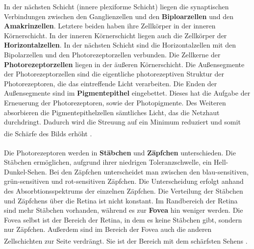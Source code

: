 \documentclass[12pt,a4paper,pdftex]{article}
\begin{document}
In der nächsten Schicht (innere plexiforme Schicht) liegen die synaptischen Verbindungen zwischen den Ganglienzellen und den \textbf{Biploarzellen}  und den \textbf{Amakrinzellen}.  Letztere beiden haben ihre Zellkörper in der inneren Körnerschicht. In der inneren Körnerschicht liegen auch die Zellkörper der \textbf{Horizontalzellen}.  In der nächsten Schicht sind die Horizontalzellen mit den Bipolarzellen und den Photorezeptorzellen verbunden. Die Zellkerne der \textbf{Photorezeptorzellen}  liegen in der äußeren Körnerschicht. Die Außensegmente der Photorezeptorzellen sind die eigentliche photorezeptiven Struktur der Photorezeptoren, die das eintreffende Licht verarbeiten. Die Enden der Außensegmente sind im \textbf{Pigmentepithel}  eingebettet. Dieses hat die Aufgabe der Erneuerung der Photorezeptoren, sowie der Photopigmente. Des Weiteren absorbieren die Pigmentepithelzellen sämtliches Licht, das die Netzhaut durchdringt. Dadurch wird die Streuung auf ein Minimum reduziert und somit die Schärfe des Bilds erhöht \textsuperscript{\cite[10]{neurowissenschaften_baer}}.
\\
\\
\noindent Die Photorezeptoren werden in \textbf{Stäbchen}  und \textbf{Zäpfchen}  unterschieden. Die Stäbchen ermöglichen, aufgrund ihrer niedrigen Toleranzschwelle, ein Hell-Dunkel-Sehen. Bei den Zäpfchen unterscheidet man zwischen den blau-sensitiven, grün-sensitiven und rot-sensitiven Zäpfchen. Die Unterscheidung erfolgt anhand des Absorbtionsspektrums der einzelnen Zäpfchen. Die Verteilung der Stäbchen und Zäpfchens über die Retina ist nicht konstant. Im Randbereich der Retina sind mehr Stäbchen vorhanden, während es zur \textbf{Fovea}  hin weniger werden. Die Fovea selbst ist der Bereich der Retina, in dem es keine Stäbchen gibt, sondern nur Zäpfchen. Außerdem sind im Bereich der Fovea auch die anderen Zellschichten zur Seite verdrängt. Sie ist der Bereich mit dem schärfsten Sehens \textsuperscript{\cite[10]{neurowissenschaften_baer}}.
\end{document}

